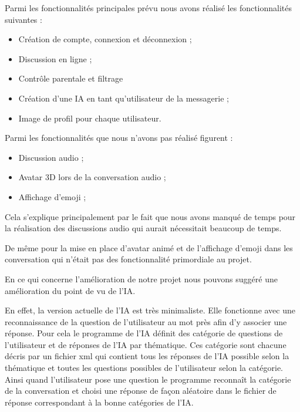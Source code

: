 
\par Parmi les fonctionnalités principales prévu nous avons réalisé les fonctionnalités suivantes : 

\begin{itemize}
	\item Création de compte, connexion et déconnexion ;
	\item Discussion en ligne ;
	\item Contrôle parentale et filtrage
	\item Création d’une IA en tant qu’utilisateur de la messagerie ;
	\item Image de profil pour chaque utilisateur.
\end{itemize}

Parmi les fonctionnalités que nous n'avons pas réalisé figurent : 

\begin{itemize}
	\item Discussion audio ;
	\item Avatar 3D lors de la conversation audio ;
	\item Affichage d’emoji ;
\end{itemize}

\par Cela s'explique principalement par le fait que nous avons manqué de temps pour la réalisation des discussions audio qui aurait nécessitait beaucoup de temps.

\par De même pour la mise en place d'avatar animé et de l'affichage d'emoji dans les conversation qui n'était pas des fonctionnalité primordiale au projet.  \\



\par En ce qui concerne l’amélioration de notre projet nous pouvons suggéré une amélioration du point de vu de l'IA.

\par En effet, la version actuelle de l'IA est très minimaliste. Elle fonctionne avec une reconnaissance de la question de l'utilisateur au mot près afin d'y associer une réponse. Pour cela le programme de l'IA définit des catégorie de questions de l'utilisateur et de réponses de l'IA par thématique. Ces catégorie sont chacune décris par un fichier xml qui contient tous les réponses de l'IA possible selon la thématique et toutes les questions possibles de l’utilisateur selon la catégorie. Ainsi quand l'utilisateur pose une question le programme reconnaît la catégorie de la conversation et choisi une réponse de façon aléatoire dans le fichier de réponse correspondant à la bonne catégories de l'IA. 

